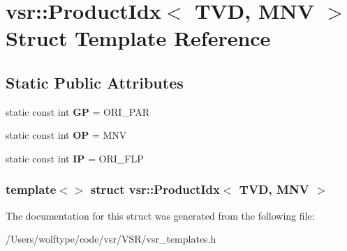 \hypertarget{structvsr_1_1_product_idx_3_01_t_v_d_00_01_m_n_v_01_4}{\section{vsr\-:\-:Product\-Idx$<$ T\-V\-D, M\-N\-V $>$ Struct Template Reference}
\label{structvsr_1_1_product_idx_3_01_t_v_d_00_01_m_n_v_01_4}
}
\subsection*{Static Public Attributes}
\begin{DoxyCompactItemize}
\item 
\hypertarget{structvsr_1_1_product_idx_3_01_t_v_d_00_01_m_n_v_01_4_aa655b6c8b63595ae57bc3f562eec6c13}{static const int {\bfseries G\-P} = O\-R\-I\-\_\-\-P\-A\-R}\label{structvsr_1_1_product_idx_3_01_t_v_d_00_01_m_n_v_01_4_aa655b6c8b63595ae57bc3f562eec6c13}

\item 
\hypertarget{structvsr_1_1_product_idx_3_01_t_v_d_00_01_m_n_v_01_4_a037538ed86da661e40a12749eba9a23a}{static const int {\bfseries O\-P} = M\-N\-V}\label{structvsr_1_1_product_idx_3_01_t_v_d_00_01_m_n_v_01_4_a037538ed86da661e40a12749eba9a23a}

\item 
\hypertarget{structvsr_1_1_product_idx_3_01_t_v_d_00_01_m_n_v_01_4_a2f63bd4a8fe521c92cd0ee2d63876658}{static const int {\bfseries I\-P} = O\-R\-I\-\_\-\-F\-L\-P}\label{structvsr_1_1_product_idx_3_01_t_v_d_00_01_m_n_v_01_4_a2f63bd4a8fe521c92cd0ee2d63876658}

\end{DoxyCompactItemize}
\subsubsection*{template$<$$>$ struct vsr\-::\-Product\-Idx$<$ T\-V\-D, M\-N\-V $>$}



The documentation for this struct was generated from the following file\-:\begin{DoxyCompactItemize}
\item 
/\-Users/wolftype/code/vsr/\-V\-S\-R/vsr\-\_\-templates.\-h\end{DoxyCompactItemize}
